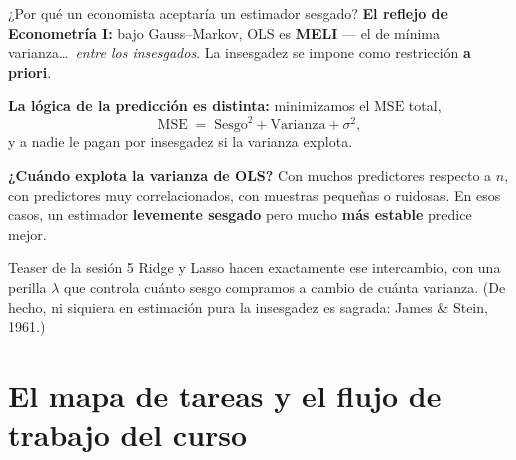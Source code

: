 \documentclass{beamer}
\newcommand{\1}{\mathbb{I}}
\newcommand{\MSE}{\mathrm{MSE}}
\begin{document}
\begin{frame}{¿Por qué un economista aceptaría un estimador sesgado?}
\small
\textbf{El reflejo de Econometría I:} bajo Gauss--Markov, OLS es \textbf{MELI} --- el de mínima varianza\ldots\ \emph{entre los insesgados}. La insesgadez se impone como restricción \textbf{a priori}.
\pause

\vspace{0.2cm}
\textbf{La lógica de la predicción es distinta:} minimizamos el $\MSE$ total,
\[ \MSE \;=\; \text{Sesgo}^2 + \text{Varianza} + \sigma^2, \]
y a nadie le pagan por insesgadez si la varianza explota.
\pause

\vspace{0.2cm}
\textbf{¿Cuándo explota la varianza de OLS?} Con muchos predictores respecto a $n$, con predictores muy correlacionados, con muestras pequeñas o ruidosas. En esos casos, un estimador \textbf{levemente sesgado} pero mucho \textbf{más estable} predice mejor.
\pause

\vspace{0.2cm}
\begin{block}{Teaser de la sesión 5}
Ridge y Lasso hacen exactamente ese intercambio, con una perilla $\lambda$ que controla cuánto sesgo compramos a cambio de cuánta varianza. (De hecho, ni siquiera en estimación pura la insesgadez es sagrada: James \& Stein, 1961.)
\end{block}
\end{frame}


\section{El mapa de tareas y el flujo de trabajo del curso}
\begin{frame}[noframenumbering]
\tableofcontents[currentsection]
\end{frame}
\end{document}
